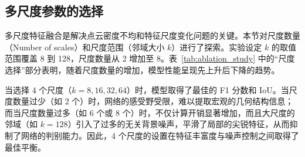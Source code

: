 \subsection{多尺度参数的选择}

多尺度特征融合是解决点云密度不均和特征尺度变化问题的关键。本节对尺度数量（Number of scales）和尺度范围（邻域大小 $k$）进行了探索。实验设定 $k$ 的取值范围覆盖 8 到 128，尺度数量从 2 增加至 8。表~\ref{tab:ablation_study} 中的“尺度选择”部分表明，随着尺度数量的增加，模型性能呈现先上升后下降的趋势。

当选择 4 个尺度（$k=8, 16, 32, 64$）时，模型取得了最佳的 F1 分数和 IoU。当尺度数量过少（如 2 个）时，网络的感受野受限，难以提取宏观的几何结构信息；而当尺度数量过多（如 6 个或 8 个）时，不仅计算开销显著增加，而且大尺度的邻域（如 $k=128$）引入了过多的无关背景噪声，平滑了局部的尖锐特征，从而抑制了网络的判别能力。因此，4 个尺度的设置在特征丰富度与噪声控制之间取得了最佳平衡。

